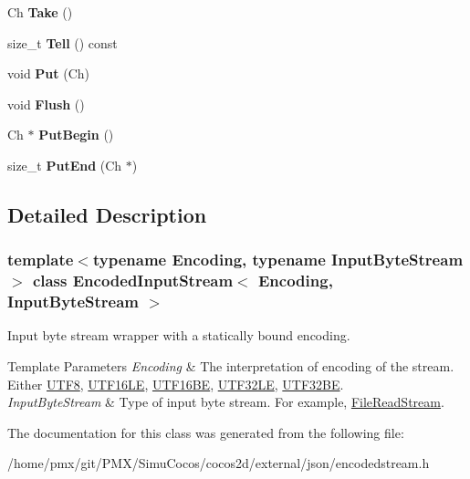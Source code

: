 \begin{DoxyCompactItemize}
\mbox{\label{classEncodedInputStream_ab42cd57581bf62e42af471583e5b8377}} 
Ch {\bfseries Take} ()
\item 
\mbox{\label{classEncodedInputStream_afbe4ac0fc57fa992ba3aa5da8dc66527}} 
size\+\_\+t {\bfseries Tell} () const
\item 
\mbox{\label{classEncodedInputStream_afea36b666a44bd4adeabfcab7b68a322}} 
void {\bfseries Put} (Ch)
\item 
\mbox{\label{classEncodedInputStream_aa4415bf4b97dd01e8c3de0ad7a161724}} 
void {\bfseries Flush} ()
\item 
\mbox{\label{classEncodedInputStream_ad97f7a549a8622c61b7fb2c63fedd69b}} 
Ch $\ast$ {\bfseries Put\+Begin} ()
\item 
\mbox{\label{classEncodedInputStream_a83fe5ed281413d6005d1b324730e8bed}} 
size\+\_\+t {\bfseries Put\+End} (Ch $\ast$)
\end{DoxyCompactItemize}


\subsection{Detailed Description}
\subsubsection*{template$<$typename Encoding, typename Input\+Byte\+Stream$>$\newline
class Encoded\+Input\+Stream$<$ Encoding, Input\+Byte\+Stream $>$}

Input byte stream wrapper with a statically bound encoding. 


\begin{DoxyTemplParams}{Template Parameters}
{\em Encoding} & The interpretation of encoding of the stream. Either \hyperlink{structUTF8}{U\+T\+F8}, \hyperlink{structUTF16LE}{U\+T\+F16\+LE}, \hyperlink{structUTF16BE}{U\+T\+F16\+BE}, \hyperlink{structUTF32LE}{U\+T\+F32\+LE}, \hyperlink{structUTF32BE}{U\+T\+F32\+BE}. \\
\hline
{\em Input\+Byte\+Stream} & Type of input byte stream. For example, \hyperlink{classFileReadStream}{File\+Read\+Stream}. \\
\hline
\end{DoxyTemplParams}


The documentation for this class was generated from the following file\+:\begin{DoxyCompactItemize}
\item 
/home/pmx/git/\+P\+M\+X/\+Simu\+Cocos/cocos2d/external/json/encodedstream.\+h\end{DoxyCompactItemize}
